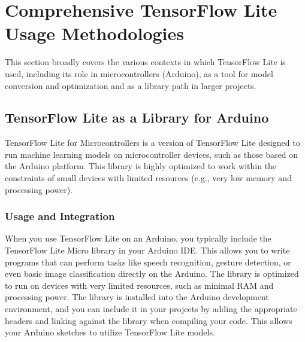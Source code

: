 \chapter{Comprehensive TensorFlow Lite Usage Methodologies}
This section broadly covers the various contexts in which TensorFlow Lite is used, including its role in microcontrollers (Arduino), as a tool for model conversion and optimization and as a library path in larger projects.

\section{TensorFlow Lite as a Library for Arduino}
TensorFlow Lite for Microcontrollers is a version of TensorFlow Lite designed to run machine learning models on microcontroller devices, such as those based on the Arduino platform. This library is highly optimized to work within the constraints of small devices with limited resources (e.g., very low memory and processing power). \cite{tensorflowblog:2024}

\subsection{Usage and Integration}

When you use TensorFlow Lite on an Arduino, you typically include the TensorFlow Lite Micro library in your Arduino IDE. This allows you to write programs that can perform tasks like speech recognition, gesture detection, or even basic image classification directly on the Arduino. The library is optimized to run on devices with very limited resources, such as minimal RAM and processing power. 
The library is installed into the Arduino development environment, and you can include it in your projects by adding the appropriate headers and linking against the library when compiling your code. This allows your Arduino sketches to utilize TensorFlow Lite models. \cite{tensorflowblog:2024}


